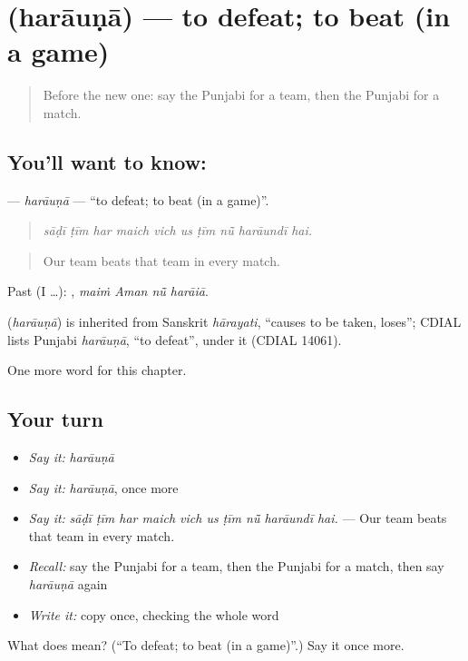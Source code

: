 \section[\texorpdfstring{\pa{ਹਰਾਉਣਾ} (harāuṇā)}{ਹਰਾਉਣਾ (harāuṇā)}]{ (harāuṇā) — to defeat; to beat (in a game)}

\label{lesson:PA-C351-harauna}



\begin{quote}
Before the new one: say the Punjabi for a team, then the Punjabi for a match.
\end{quote}

\subsection*{You'll want to know: }
\textbf{} — \emph{harāuṇā} — \textquotedblleft{}to defeat; to beat (in a game)\textquotedblright{}.

\begin{quote}
         
\end{quote}

\begin{quote}
\emph{sāḍī ṭīm har maich vich us ṭīm nū̃ harāundī hai.}
\end{quote}

\begin{quote}
Our team beats that team in every match.
\end{quote}

Past (I …):    , \emph{maiṁ Aman nū̃ harāiā}.

\begin{cousinweb}
\textbf{} (\emph{harāuṇā}) is inherited from Sanskrit \emph{hārayati}, \textquotedblleft{}causes to be taken, loses\textquotedblright{}; CDIAL lists Punjabi \emph{harāuṇā}, \textquotedblleft{}to defeat\textquotedblright{}, under it (CDIAL 14061).
\end{cousinweb}

\begin{grammarlens}[title={What you've built}]
One more word for this chapter.
\end{grammarlens}

\subsection*{Your turn}
\begin{itemize}
\raggedright
  \item \emph{Say it:} \emph{harāuṇā}
  \item \emph{Say it:} \emph{harāuṇā}, once more
  \item \emph{Say it:} \emph{sāḍī ṭīm har maich vich us ṭīm nū̃ harāundī hai.} — Our team beats that team in every match.
  \item \emph{Recall:} say the Punjabi for a team, then the Punjabi for a match, then say \emph{harāuṇā} again
  \item \emph{Write it:} copy \textbf{} once, checking the whole word
\end{itemize}

\begin{tcolorbox}[breakable,colback=teal!4,colframe=teal!35!black,title={Before you move on}]
What does  mean? (\textquotedblleft{}To defeat; to beat (in a game)\textquotedblright{}.) Say it once more.
\end{tcolorbox}
